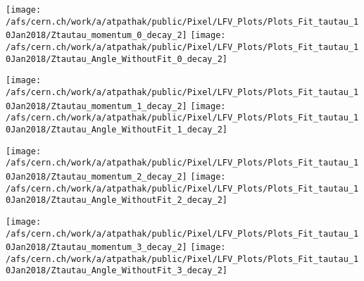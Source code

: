 \documentclass{beamer}
\begin{document}
\begin{frame}
\begin{normalsize}
\begin{center}
\texttt{[image: /afs/cern.ch/work/a/atpathak/public/Pixel/LFV\_Plots/Plots\_Fit\_tautau\_10Jan2018/Ztautau\_momentum\_0\_decay\_2]}
\texttt{[image: /afs/cern.ch/work/a/atpathak/public/Pixel/LFV\_Plots/Plots\_Fit\_tautau\_10Jan2018/Ztautau\_Angle\_WithoutFit\_0\_decay\_2]} 
\end{center}
\end{normalsize}
\end {frame}
\begin{frame}
\begin{normalsize}
\begin{center}
\texttt{[image: /afs/cern.ch/work/a/atpathak/public/Pixel/LFV\_Plots/Plots\_Fit\_tautau\_10Jan2018/Ztautau\_momentum\_1\_decay\_2]}
\texttt{[image: /afs/cern.ch/work/a/atpathak/public/Pixel/LFV\_Plots/Plots\_Fit\_tautau\_10Jan2018/Ztautau\_Angle\_WithoutFit\_1\_decay\_2]} 
\end{center}
\end{normalsize}
\end {frame}
\begin{frame}
\begin{normalsize}
\begin{center}
\texttt{[image: /afs/cern.ch/work/a/atpathak/public/Pixel/LFV\_Plots/Plots\_Fit\_tautau\_10Jan2018/Ztautau\_momentum\_2\_decay\_2]}
\texttt{[image: /afs/cern.ch/work/a/atpathak/public/Pixel/LFV\_Plots/Plots\_Fit\_tautau\_10Jan2018/Ztautau\_Angle\_WithoutFit\_2\_decay\_2]} 
\end{center}
\end{normalsize}
\end {frame}
\begin{frame}
\begin{normalsize}
\begin{center}
\texttt{[image: /afs/cern.ch/work/a/atpathak/public/Pixel/LFV\_Plots/Plots\_Fit\_tautau\_10Jan2018/Ztautau\_momentum\_3\_decay\_2]}
\texttt{[image: /afs/cern.ch/work/a/atpathak/public/Pixel/LFV\_Plots/Plots\_Fit\_tautau\_10Jan2018/Ztautau\_Angle\_WithoutFit\_3\_decay\_2]} 
\end{center}
\end{normalsize}
\end {frame}
\end{document}
